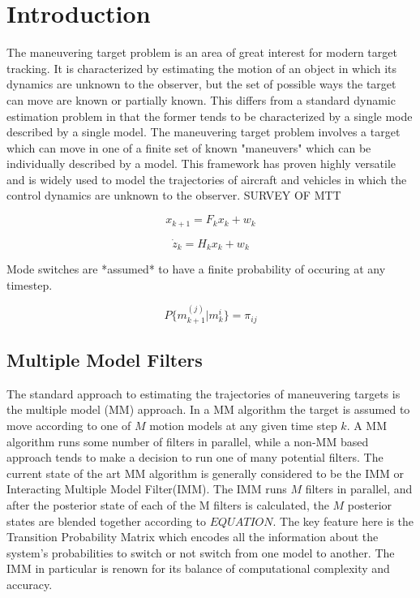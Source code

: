 \documentclass[twocolumn,letterpaper]{IEEEAerospaceCLS}  %
\begin{document}
\tableofcontents


\section{Introduction}

The maneuvering target problem is an area of great interest for modern target tracking. It is characterized by estimating the motion of an object in which its dynamics are unknown to the observer, but the set of possible ways the target can move are known or partially known. This differs from a standard dynamic estimation problem in that the former tends to be characterized by a single mode described by a single model. The maneuvering target problem involves a target which can move in one of a finite set of known "maneuvers" which can be individually described by a model. This framework has proven highly versatile and is widely used to model the trajectories of aircraft and vehicles in which the control dynamics are unknown to the observer. SURVEY OF MTT

\begin{equation}
x_{k+1} = F_k x_k + w_k
\end{equation}

\begin{equation}
\dot{z}_{k} = H_k x_k + w_k
\end{equation}




Mode switches are *assumed* to have a finite probability of occuring at any timestep.

\begin{equation}
P\{m^{(j)}_{k+1} | m^{i}_{k} \} = \pi_{ij}
\end{equation}


\subsection{Multiple Model Filters}
The standard approach to estimating the trajectories of maneuvering targets is the multiple model (MM) approach. In a MM algorithm the target is assumed to move according to one of $M$ motion models at any given time step $k$. A MM algorithm runs some number of filters in parallel, while a non-MM based approach tends to make a decision to run one of many potential filters. The current state of the art MM algorithm is generally considered to be the IMM or Interacting Multiple Model Filter(IMM). The IMM runs $M$ filters in parallel, and after the posterior state of each of the M filters is calculated, the $M$ posterior states are blended together according to $EQUATION$. The key feature here is the Transition Probability Matrix which encodes all the information about the system's probabilities to switch or not switch from one model to another. The IMM in particular is renown for its balance of computational complexity and accuracy.
\end{document}
